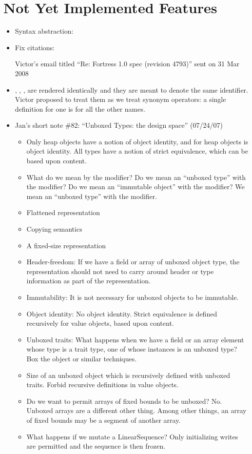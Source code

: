 \section{Not Yet Implemented Features}
\begin{itemize}
\item Syntax abstraction:

\item Fix citations:

Victor's email titled ``Re: Fortress 1.0 spec (revision 4793)'' sent on
31 Mar 2008

\item {}, , ,  are rendered identically and they are meant to denote the same identifier.
Victor proposed to treat them as we treat synonym operators: a single definition for one is for all the other names.

\item Jan's short note \#82: ``Unboxed Types: the design space'' (07/24/07)
 \begin{itemize}
\item Only heap objects have a notion of object identity, and for heap objects
 is object identity. All types have a notion of strict equivalence, which can be based upon content.
\item What do we mean by the  modifier? Do we mean an ``unboxed type'' with the  modifier? Do we mean an ``immutable object'' with the  modifier? We mean an ``unboxed type'' with the  modifier.
\item Flattened representation
\item Copying semantics
\item A fixed-size representation
\item Header-freedom: If we have a field or array of unboxed object type, the representation should not need to carry around header or type information as part of the representation.
\item Immutability: It is not necessary for unboxed objects to be immutable.
\item Object identity: No object identity. Strict equivalence is defined recursively for value objects, based upon content.
\item Unboxed traits: What happens when we have a field or an array element whose type is a trait type, one of whose instances is an unboxed type? Box the object or similar techniques.
\item Size of an unboxed object which is recursively defined with unboxed traits. Forbid recursive definitions in value objects.
\item Do we want to permit arrays of fixed bounds to be unboxed? No. Unboxed arrays are a different other thing. Among other things, an array of fixed bounds may be a segment of another array.
\item What happens if we mutate a LinearSequence? Only initializing writes are permitted and the sequence is then frozen.
 \end{itemize}


\end{itemize}
